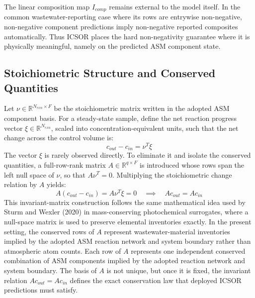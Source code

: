 \documentclass[a4paper,fleqn]{cas-sc}
\newenvironment{revblock}{}{}
\newenvironment{revblockr22}{}{}
\begin{document}
\begin{revblock}
The linear composition map $I_{comp}$ remains external to the model itself. In the common wastewater-reporting case where its rows are entrywise non-negative, non-negative component predictions imply non-negative reported composites automatically. Thus ICSOR places the hard non-negativity guarantee where it is physically meaningful, namely on the predicted ASM component state.

\begin{revblockr22}
\subsection{Stoichiometric Structure and Conserved Quantities}

Let $\nu \in \mathbb{R}^{N_{rxn} \times F}$ be the stoichiometric matrix written in the adopted ASM component basis. For a steady-state sample, define the net reaction progress vector $\xi \in \mathbb{R}^{N_{rxn}}$, scaled into concentration-equivalent units, such that the net change across the control volume is:
\begin{equation}
\label{eq:stoichiometric-change}
 c_{out} - c_{in} = \nu^T \xi
\end{equation}
The vector $\xi$ is rarely observed directly. To eliminate it and isolate the conserved quantities, a full-row-rank matrix $A \in \mathbb{R}^{q \times F}$ is introduced whose rows span the left null space of $\nu$, so that $A\nu^T = 0$. Multiplying the stoichiometric change relation by $A$ yields:
\begin{equation}
\label{eq:invariant-conservation}
 A(c_{out} - c_{in}) = A \nu^T \xi = 0 \quad \implies \quad A c_{out} = A c_{in}
\end{equation}
This invariant-matrix construction follows the same mathematical idea used by Sturm and Wexler (2020) in mass-conserving photochemical surrogates, where a null-space matrix is used to preserve elemental inventories exactly. In the present setting, the conserved rows of $A$ represent wastewater-material inventories implied by the adopted ASM reaction network and system boundary rather than atmospheric atom counts.
Each row of $A$ represents one independent conserved combination of ASM components implied by the adopted reaction network and system boundary. The basis of $A$ is not unique, but once it is fixed, the invariant relation $Ac_{out} = Ac_{in}$ defines the exact conservation law that deployed ICSOR predictions must satisfy.
\end{revblockr22}


\end{revblock}
\end{document}
